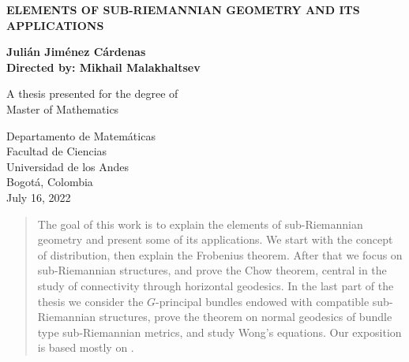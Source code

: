 \documentclass[12pt, letterpaper, reqno]{amsart}
\author{}
\title{}
\let\oldtableofcontents\tableofcontents
\renewcommand{\tableofcontents}{%
  \vspace*{-\linespacing}%
  \oldtableofcontents}
\theoremstyle{definition}
\theoremstyle{plain}
\theoremstyle{remark}
\begin{document}
\begin{titlepage}
    \begin{center}
        \vspace*{1cm}
            
        \Huge
	\textbf{ELEMENTS OF SUB-RIEMANNIAN GEOMETRY AND ITS APPLICATIONS}
        \vspace{0.5cm}
        \LARGE
            
        \vspace{1.5cm}
            
        \textbf{Julián Jiménez Cárdenas}\\
        \textbf{Directed by: Mikhail Malakhaltsev}
            
        \vfill
            
        A thesis presented for the degree of\\
        Master of Mathematics
            
        \vspace{0.8cm}
            
            
        \Large
        Departamento de Matemáticas\\
        Facultad de Ciencias \\
        Universidad de los Andes\\
        Bogotá, Colombia\\
        July 16, 2022
            
    \end{center}
\end{titlepage}
\maketitle
\newpage
\tableofcontents
\newpage
\begin{abstract}
		The goal of this work is to explain the elements of sub-Riemannian geometry and present some of its applications. We start with the concept of distribution, then explain the Frobenius theorem. After that we focus on sub-Riemannian structures, and prove the Chow theorem, central in the study of connectivity through horizontal geodesics. In the last part of the thesis we consider the $ G $-principal bundles endowed with compatible sub-Riemannian structures, prove the theorem on normal geodesics of bundle type sub-Riemannian metrics, and study Wong's equations. Our exposition is based mostly on \cite{montgomery2002tour}.
\end{abstract}
\newpage
{}
\end{document}
